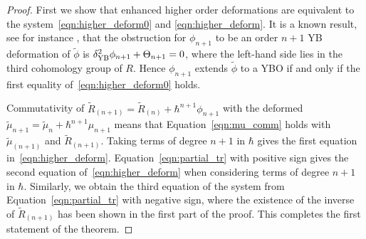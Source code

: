 \documentclass[11pt,fleqn]{amsart} %
\begin{document}
\begin{proof} 
	First we  show that enhanced higher order deformations are equivalent to the system~\eqref{eqn:higher_deform0} and \eqref{eqn:higher_deform}. It is a known result, see for instance \cite{SZ-YBH}, that the obstruction for $\phi_{n+1}$ to be an order $n+1$ YB deformation of $\tilde \phi$ is $\delta^2_{\rm YB} \phi_{n+1} + \Theta_{n+1} = 0$, where the left-hand side lies in the third cohomology group of $R$. Hence 
		$\phi_{n+1}$ extends $\tilde \phi$ to a YBO if and only if the first equality of~\eqref{eqn:higher_deform0} holds. 
		
		
		Commutativity of $\tilde R_{(n+1)}= \tilde R_{(n)}+ \hbar^{n+1}\phi_{n+1}$ with the deformed 
		$\tilde  \mu_{n+1} = \tilde \mu_{n} + \hbar^{n+1}\mu_{n+1}$ means that Equation~\eqref{eqn:mu_comm} holds with $\tilde \mu_{(n+1)}$ and $\tilde R_{(n+1)}$. Taking terms of degree $n+1$ in $\hbar$ gives the first  
		equation in~\eqref{eqn:higher_deform}. Equation~\eqref{eqn:partial_tr} with positive sign gives the 
		second 
		equation of~\eqref{eqn:higher_deform} when considering terms of degree $n+1$ in $\hbar$. Similarly, we obtain the third 
		 equation of the system from Equation~\eqref{eqn:partial_tr} with negative sign, where the existence of the inverse of $\tilde R_{(n+1)} $ has been shown in the first part of the proof. This completes the first statement of the theorem. 


\end{proof}
\end{document}
